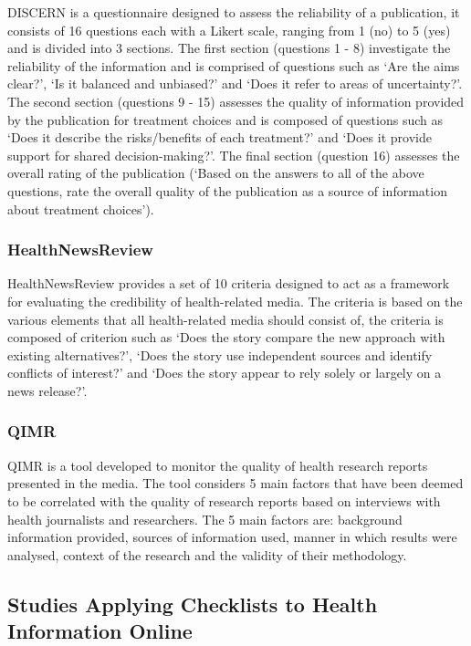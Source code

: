 \documentclass[a4paper,twoside,phd]{BYUPhys}
\begin{document}
DISCERN \cite{DISCERN} is a questionnaire designed to assess the reliability of a publication, it consists of 16 questions each with a Likert scale, ranging from 1 (no) to 5 (yes) and is divided into 3 sections. The first section (questions 1 - 8) investigate the reliability of the information and is comprised of questions such as `Are the aims clear?', `Is it balanced and unbiased?' and `Does it refer to areas of uncertainty?'. The second section (questions 9 - 15) assesses the quality of information provided by the publication for treatment choices and is composed of questions such as `Does it describe the risks/benefits of each treatment?' and `Does it provide support for shared decision-making?'. The final section (question 16) assesses the overall rating of the publication (`Based on the answers to all of the above questions, rate the overall quality of the publication as a source of information about treatment choices').


\subsubsection{HealthNewsReview}
\label{sec:HealthNewsReview}

HealthNewsReview \cite{HealthNewsReview} provides a set of 10 criteria designed to act as a framework for evaluating the credibility of health-related media. The criteria is based on the various elements that all health-related media should consist of, the criteria is composed of criterion such as `Does the story compare the new approach with existing alternatives?', `Does the story use independent sources and identify conflicts of interest?' and `Does the story appear to rely solely or largely on a news release?'.

\subsubsection{QIMR}
\label{sec:QIMR}

QIMR \cite{QIMR} is a tool developed to monitor the quality of health research reports presented in the media. The tool considers 5 main factors that have been deemed to be correlated with the quality of research reports based on interviews with health journalists and researchers. The 5 main factors are: background information provided, sources of information used, manner in which results were analysed, context of the research and the validity of their methodology.

\subsection{Studies Applying Checklists to Health Information Online}
\label{sec:ChecklistStudies}
\end{document}
